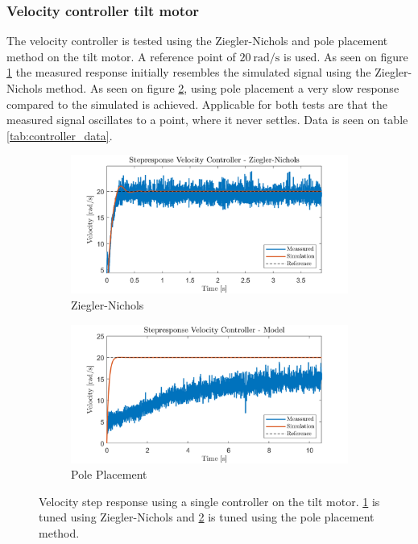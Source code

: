 \documentclass[../../main.tex]{subfiles}
\begin{document}
\subsubsection*{Velocity controller tilt motor}
The velocity controller is tested using the Ziegler-Nichols and pole placement method on the tilt motor. A reference point of $\SI{20}{\mathrm{rad}/\second}$ is used. As seen on figure \ref{fig:StepVelZN} the measured response initially resembles the simulated signal using the Ziegler-Nichols method. As seen on figure \ref{fig:StepVelModel}, using pole placement a very slow response compared to the simulated is achieved. Applicable for both tests are that the measured signal oscillates to a point, where it never settles. Data is seen on table \ref{tab:controller_data}.

\begin{figure}[h]
     \centering
     \begin{subfigure}[b]{0.49\textwidth}
         \centering
         \includegraphics[width=\textwidth]{Sections/Test/Images/StepVelocityZN.png}
         \caption{Ziegler-Nichols}
         \label{fig:StepVelZN}
     \end{subfigure}
     \hfill
     \begin{subfigure}[b]{0.49\textwidth}
         \centering
         \includegraphics[width=\textwidth]{Sections/Test/Images/StepVelocityModel.png}
         \caption{Pole Placement}
         \label{fig:StepVelModel}
     \end{subfigure}
        \caption{Velocity step response using a single controller on the tilt motor. \ref{fig:StepVelZN} is tuned using Ziegler-Nichols and \ref{fig:StepVelModel} is tuned using the pole placement method.}
        \label{fig:VelocityTilt}
\end{figure}
\end{document}

